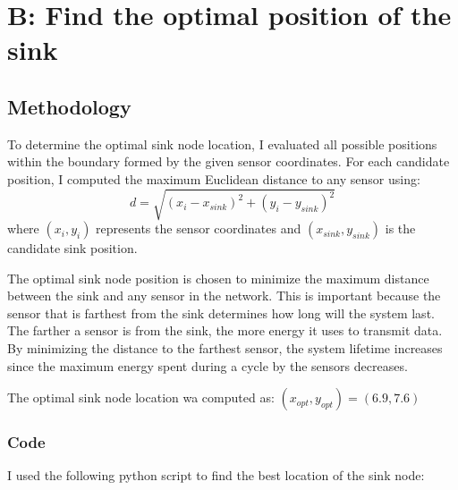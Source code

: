 \documentclass{Configuration_Files/PoliMi3i_thesis}
\begin{document}
\chapter{B: Find the optimal position of the sink}

\section{Methodology}

To determine the optimal sink node location, I evaluated all possible positions within the boundary formed by the given sensor coordinates. For each candidate position, I computed the maximum Euclidean distance to any sensor using:
\begin{equation}
d = \sqrt{(x_i - x_{sink})^2 + (y_i - y_{sink})^2}
\end{equation}
where $(x_i, y_i)$ represents the sensor coordinates and $(x_{sink}, y_{sink})$ is the candidate sink position.

The optimal sink node position is chosen to minimize the maximum distance between the sink and any sensor in the network. This is important because the sensor that is farthest from the sink determines how long will the system last. The farther a sensor is from the sink, the more energy it uses to transmit data. By minimizing the distance to the farthest sensor, the system lifetime increases since the maximum energy spent during a cycle by the sensors decreases.

The optimal sink node location wa computed as:
$(x_{opt}, y_{opt}) = (6.9, 7.6)$

\subsection{Code}
I used the following python script to find the best location of the sink node:


\newpage
\end{document}
